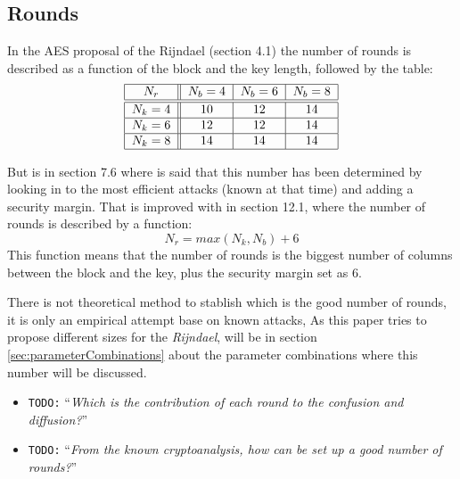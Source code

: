 \documentclass[10pt,a4paper,twoside]{llncs}
\newcommand{\todo}[1]{\texttt{\color{red}TODO:} ``\emph{#1}''}
\newcommand{\rijndael}{\emph{Rijndael}}
\begin{document}
\subsection{Rounds}\label{sec:rounds}

In the AES proposal of the Rijndael \cite{Daemen01aes-ammended} (section 4.1) the number of rounds is described as a function of the block and the key length, followed by the table:
\begin{equation}\label{tab:nrounds}
\begin{tabular}{|c||c|c|c|}
\hline
$N_r$     & $N_b = 4$ & $N_b = 6$ & $N_b = 8$ \\ \hline\hline
$N_k = 4$ &    $10$   &    $12$   &    $14$   \\ \hline
$N_k = 6$ &    $12$   &    $12$   &    $14$   \\ \hline
$N_k = 8$ &    $14$   &    $14$   &    $14$   \\ \hline
\end{tabular}
\end{equation}

 But is in section 7.6 where is said that this number has been determined by looking in to the most efficient attacks (known at that time) and adding a security margin. That is improved with in section 12.1, where the number of rounds is described by a function:
\begin{equation}\label{eq:nrounds}
 N_r = max(N_k,N_b)+6
\end{equation}
This function means that the number of rounds is the biggest number of columns between the block and the key, plus the security margin set as $6$.

There is not theoretical method to stablish which is the good number of rounds, it is only an empirical attempt base on known attacks, As this paper tries to propose different sizes for the \rijndael, will be in section \ref{sec:parameterCombinations} about the parameter combinations where this number will be discussed.

\begin{itemize}
    \item \todo{Which is the contribution of each round to the confusion and diffusion?}
    \item \todo{From the known cryptoanalysis, how can be set up a good number of rounds?}
\end{itemize}
\end{document}
